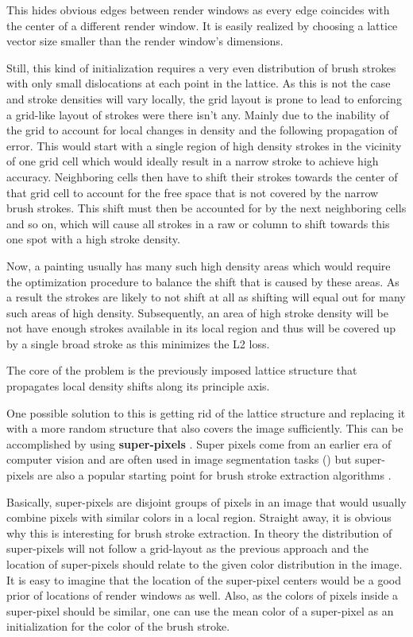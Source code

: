This hides obvious edges between render windows as every edge coincides with the center
of a different render window.
It is easily realized by choosing a lattice vector size smaller than the render window's
dimensions.

Still, this kind of initialization requires a very even distribution of brush strokes
with only small dislocations at each point in the lattice.
As this is not the case and stroke densities will vary locally, the grid layout is prone
to lead to enforcing a grid-like layout of strokes were there isn't any.
Mainly due to the inability of the grid to account for local changes in density and
the following propagation of error.
This would start with a single region of high density strokes in the vicinity of one
grid cell which would ideally result in a narrow stroke to achieve high accuracy.
Neighboring cells then have to shift their strokes towards the center of that grid cell
to account for the free space that is not covered by the narrow brush strokes.
This shift must then be accounted for by the next neighboring cells and so on, which
will cause all strokes in a raw or column to shift towards this one spot with a high
stroke density.

Now, a painting usually has many such high density areas which would require the
optimization procedure to balance the shift that is caused by these areas.
As a result the strokes are likely to not shift at all as shifting will equal out
for many such areas of high density.
Subsequently, an area of high stroke density will be not have enough strokes available
in its local region and thus will be covered up by a single broad stroke as this minimizes
the L2 loss.

The core of the problem is the previously imposed lattice structure that propagates
local density shifts along its principle axis.

One possible solution to this is getting rid of the lattice structure and replacing
it with a more random structure that also covers the image sufficiently.
This can be accomplished by using \textbf{super-pixels} \cite{superpixels}.
Super pixels come from an earlier era of computer vision and are often used in image
segmentation tasks (\cite{img segmentation with SP}) but super-pixels are also
a popular starting point for brush stroke extraction algorithms \cite{brushs stroke extraction}.

Basically, super-pixels are disjoint groups of pixels in an image that would usually
combine pixels with similar colors in a local region.
Straight away, it is obvious why this is interesting for brush stroke extraction.
In theory the distribution of super-pixels will not follow a grid-layout as the previous
approach and the location of super-pixels should relate to the given color distribution
in the image.
It is easy to imagine that the location of the super-pixel centers would be a good prior
of locations of render windows as well.
Also, as the colors of pixels inside a super-pixel should be similar, one can use
the mean color of a super-pixel as an initialization for the color of the brush stroke.

